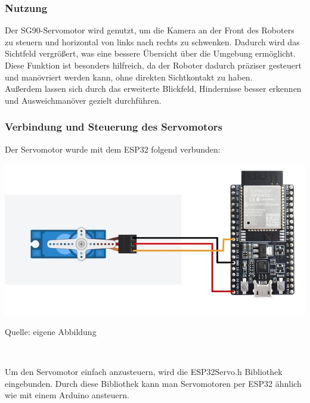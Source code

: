 \documentclass[ngerman,12pt,a4paper]{article}
\begin{document}
				\subsubsection{Nutzung} %
				Der SG90-Servomotor wird genutzt, um die Kamera an der Front des Roboters zu steuern und horizontal von links nach rechts zu schwenken. Dadurch wird das Sichtfeld vergrößert, was eine bessere Übersicht über die Umgebung ermöglicht. \\
				Diese Funktion ist besonders hilfreich, da der Roboter dadurch präziser gesteuert und manövriert werden kann, ohne direkten Sichtkontakt zu haben.\\
				Außerdem lassen sich durch das erweiterte Blickfeld, Hindernisse besser erkennen und Ausweichmanöver gezielt durchführen.
				\subsubsection{Verbindung und Steuerung des Servomotors} %
				
				Der Servomotor wurde mit dem ESP32 folgend verbunden:
				
				\begin{center}
					\begin{minipage}[t]{\textwidth}
						\includegraphics[scale=0.6]{Pictures/servo_verkabelung}
						\label{fig:servo_verkabelung}
						\vspace{-10pt}
						\begin{center}
							\par\small Quelle: eigene Abbildung 
						\end{center}
					\end{minipage} \\[0.70cm]
				\end{center}
				
				
				Um den Servomotor einfach anzusteuern, wird die ESP32Servo.h Bibliothek eingebunden. Durch diese Bibliothek kann man Servomotoren per ESP32 ähnlich wie mit einem Arduino ansteuern.
				
\end{document}

